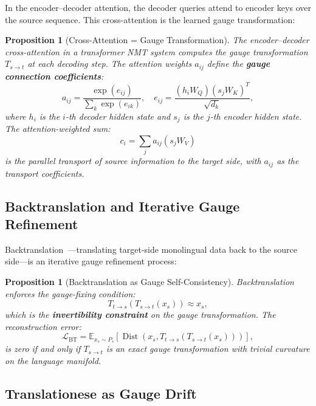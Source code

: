 \documentclass[12pt,a4paper]{article}
\newtheorem{proposition}[theorem]{Proposition}
\theoremstyle{remark}
\newcommand{\E}{\mathbb{E}}
\newcommand{\loss}{\mathcal{L}}
\DeclareMathOperator{\Dist}{Dist}
\begin{document}
In the encoder--decoder attention, the decoder queries attend to
encoder keys over the source sequence. This cross-attention is the
learned gauge transformation:

\begin{proposition}[Cross-Attention = Gauge Transformation]
\label{prop:cross_attention}
The encoder--decoder cross-attention in a transformer NMT system
computes the gauge transformation $T_{s\to t}$ at each decoding
step. The attention weights $a_{ij}$ define the \textbf{gauge
connection coefficients}:
\begin{equation}
  a_{ij} = \frac{\exp(e_{ij})}{\sum_k \exp(e_{ik})}, \quad
  e_{ij} = \frac{(h_i W_Q)(s_j W_K)^T}{\sqrt{d_k}},
\end{equation}
where $h_i$ is the $i$-th decoder hidden state and $s_j$ is the
$j$-th encoder hidden state. The attention-weighted sum:
\begin{equation}
  c_i = \sum_j a_{ij} (s_j W_V)
\end{equation}
is the parallel transport of source information to the target side,
with $a_{ij}$ as the transport coefficients.
\end{proposition}

\subsection{Backtranslation and Iterative Gauge Refinement}

Backtranslation~\cite{sennrich2016improving}---translating target-side
monolingual data back to the source side---is an iterative gauge
refinement process:

\begin{proposition}[Backtranslation as Gauge Self-Consistency]
\label{prop:backtranslation}
Backtranslation enforces the gauge-fixing condition:
\begin{equation}
  T_{t\to s}(T_{s\to t}(x_s)) \approx x_s,
\end{equation}
which is the \textbf{invertibility constraint} on the gauge transformation.
The reconstruction error:
\begin{equation}
  \loss_{\text{BT}} = \E_{x_s \sim P_s}[\Dist(x_s, T_{t\to s}(T_{s\to t}(x_s)))],
\end{equation}
is zero if and only if $T_{s\to t}$ is an exact gauge transformation
with trivial curvature on the language manifold.
\end{proposition}

\subsection{Translationese as Gauge Drift}
\end{document}

